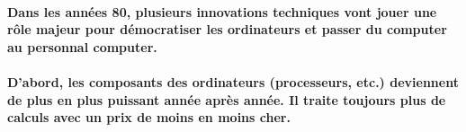 \paragraph{
  Dans les années 80, plusieurs innovations techniques vont jouer une rôle majeur pour démocratiser les ordinateurs et passer du computer au personnal computer.
}

\paragraph{
  D'abord, les composants des ordinateurs (processeurs, etc.) deviennent de plus en plus puissant année après année. Il traite toujours plus de calculs avec un prix de moins en moins cher.
}
